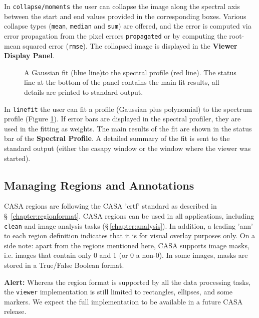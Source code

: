 In {\tt collapse/moments} the user can collapse the image along the spectral
axis between the start and end values provided in the corresponding boxes.
Various collapse types ({\tt mean}, {\tt median} and {\tt sum}) are offered,
and the error is computed via error propagation from the pixel errors
{\tt propagated} or by computing the root-mean squared error ({\tt rmse}).
The collapsed image is displayed in the {\bf Viewer Display Panel}.

\begin{figure}[h!]
\begin{center}
\caption{\label{fig:viewer_specproffit}A Gaussian fit (blue line)to the spectral
profile (red line). The status line at the bottom of the panel contains the main
fit results, all details are printed to standard output.}
\hrulefill
\end{center}
\end{figure}
In {\tt linefit} the user can fit a profile (Gaussian plus polynomial)
to the spectrum profile (Figure \ref{fig:viewer_specproffit}). If
error bars are displayed in the spectral profiler, they are used in
the fitting as weights. The main results of the fit are shown in the
status bar of the {\bf Spectral Profile}.  A detailed summary of the
fit is sent to the standard output (either the casapy window or the
window where the viewer was started).


\subsection{Managing Regions and Annotations}
\label{section:display.image.rgnmgr}

CASA regions are following the CASA 'crtf' standard as described in
\S~\ref{chapter:regionformat}. CASA regions can be used in all
applications, including {\tt clean} and image analysis tasks
(\S\,\ref{chapter:analysis}). In addition, a leading 'ann' to each
region definition indicates that it is for visual overlay purposes
only. On a side note: apart from the regions mentioned here, CASA supports
image masks, i.e. images that contain only 0 and 1 (or 0 a non-0). In
some images, masks are stored in a True/False Boolean format. 

{\bf Alert:} Whereas the region format is supported by all the data
  processing tasks, the {\tt viewer} implementation is still limited
  to rectangles, ellipses, and some markers. We expect the full
  implementation to be available in a future CASA release. 


